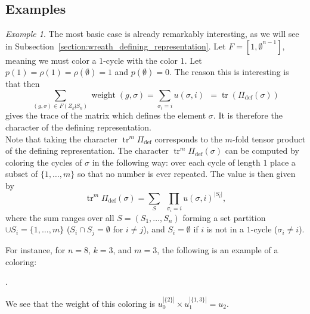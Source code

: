 \documentclass[a4paper,12pt]{amsart}
\theoremstyle{plain}
\theoremstyle{definition}
\theoremstyle{remark}
\newtheorem{example}[theorem]{Example}
\DeclareMathOperator{\defining}{def}
\DeclareMathOperator{\tr}{tr}
\DeclareMathOperator{\weight}{weight}
\begin{document}
\subsection{Examples}

\begin{example} \label{example:character_of_defining}
    The most basic case is already remarkably interesting, as we will see in Subsection~\ref{section:wreath_defining_representation}. Let $F = [1,\emptyset^{n-1}]$, meaning we must color a $1$-cycle with the color $1$. Let $p(1) = \rho(1)=\rho(\emptyset) = 1$ and $p(\emptyset) = 0$. The reason this is interesting is that then
    \[
    \sum_{(g,\sigma) \in F(Z_k \wr S_n)} \weight(g,\sigma) = \sum_{\sigma_i = i} u(\sigma,i) ~~= \tr( \Pi_{\defining}(\sigma))
    \]
    gives the trace of the matrix which defines the element $\sigma$. It is therefore the character of the defining representation. \\
    
    Note that taking the character $\tr^m \Pi_{\defining}$ corresponds to the $m$-fold tensor product of the defining representation. The character $\tr^m \Pi_{\defining}(\sigma)$ can be computed by coloring the cycles of $\sigma$ in the following way: over each cycle of length $1$ place a subset of $\{1,\dots,m\}$ so that no number is ever repeated. The value is then given by
    \[
    \tr^m \Pi_{\defining}(\sigma) = \sum_{S } ~~\prod_{ \sigma_i = i }
    u(\sigma,i)^{|S_i|},
    \]
    where the sum ranges over all $S = (S_1,\dots,S_n)$ forming a set partition $\cup S_i = \{1,\dots,m\}$ ($S_i \cap S_j = \emptyset$ for $i \neq j$), and $S_i = \emptyset$ if $i$ is not in a $1$-cycle ($\sigma_i \neq i$).

    For instance, for $n=8$, $k = 3$, and $m=3$, the following is an example of a coloring:
    \begin{center}
    .
    \end{center}
    We see that the weight of this coloring is $u_0^{|\{2\}|}  \times u_1^{|\{1,3\}|}= u_2$.
\end{example}
\end{document}
